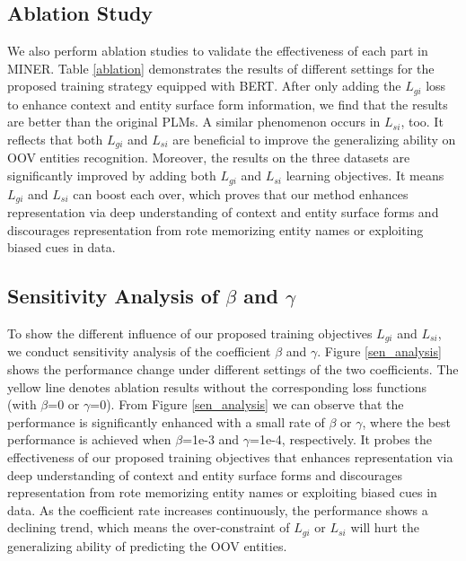 \documentclass[11pt]{article}
\begin{document}
\subsection{Ablation Study}
We also perform ablation studies to validate the effectiveness of each part in MINER. Table \ref{ablation} demonstrates the results of different settings for the proposed training strategy equipped with BERT. After only adding the $L_{gi}$ loss to enhance context and entity surface form information, we find that the results are better than the original PLMs. A similar phenomenon occurs in $L_{si}$, too. It reflects that both $L_{gi}$ and $L_{si}$ are beneficial to improve the generalizing ability on OOV entities recognition. Moreover, the results on the three datasets are significantly improved by adding both $L_{gi}$ and $L_{si}$ learning objectives. It means $L_{gi}$ and $L_{si}$ can boost each over, which proves that our method enhances representation via deep understanding of context and entity surface forms and discourages representation from rote memorizing entity names or exploiting biased cues in data.


\subsection{Sensitivity Analysis of $\beta$ and $\gamma$}

To show the different influence of our proposed training objectives $L_{gi}$ and $L_{si}$, we conduct sensitivity analysis of the coefficient $\beta$ and $\gamma$. Figure \ref{sen_analysis} shows the performance change under different settings of the two coefficients. The yellow line denotes ablation results without the corresponding loss functions (with $\beta$=0 or $\gamma$=0). From Figure \ref{sen_analysis} we can observe that the performance is significantly enhanced with a small rate of $\beta$ or $\gamma$, where the best performance is achieved when $\beta$=1e-3 and $\gamma$=1e-4, respectively. It probes the effectiveness of our proposed training objectives that enhances representation via deep understanding of context and entity surface forms and discourages representation from rote memorizing entity names or exploiting biased cues in data. As the coefficient rate increases continuously, the performance shows a declining trend, which means the over-constraint of $L_{gi}$ or $L_{si}$ will hurt the generalizing ability of predicting the OOV entities.
\end{document}
